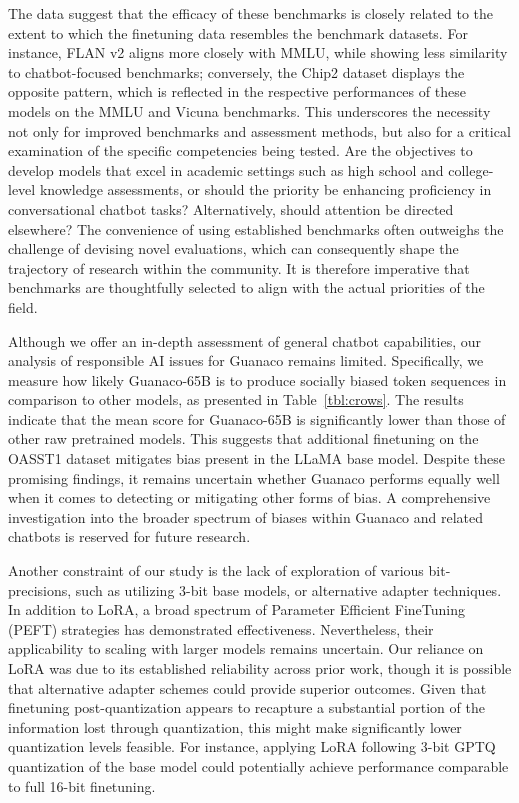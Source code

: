 The data suggest that the efficacy of these benchmarks is closely related to the extent to which the finetuning data resembles the benchmark datasets. For instance, FLAN v2 aligns more closely with MMLU, while showing less similarity to chatbot-focused benchmarks; conversely, the Chip2 dataset displays the opposite pattern, which is reflected in the respective performances of these models on the MMLU and Vicuna benchmarks. This underscores the necessity not only for improved benchmarks and assessment methods, but also for a critical examination of the specific competencies being tested. Are the objectives to develop models that excel in academic settings such as high school and college-level knowledge assessments, or should the priority be enhancing proficiency in conversational chatbot tasks? Alternatively, should attention be directed elsewhere? The convenience of using established benchmarks often outweighs the challenge of devising novel evaluations, which can consequently shape the trajectory of research within the community. It is therefore imperative that benchmarks are thoughtfully selected to align with the actual priorities of the field.

Although we offer an in-depth assessment of general chatbot capabilities, our analysis of responsible AI issues for {Guanaco} remains limited. Specifically, we measure how likely {Guanaco}-65B is to produce socially biased token sequences in comparison to other models, as presented in Table~\ref{tbl:crows}. The results indicate that the mean score for {Guanaco}-65B is significantly lower than those of other raw pretrained models. This suggests that additional finetuning on the OASST1 dataset mitigates bias present in the LLaMA base model. Despite these promising findings, it remains uncertain whether {Guanaco} performs equally well when it comes to detecting or mitigating other forms of bias. A comprehensive investigation into the broader spectrum of biases within {Guanaco} and related chatbots is reserved for future research.

Another constraint of our study is the lack of exploration of various bit-precisions, such as utilizing 3-bit base models, or alternative adapter techniques. In addition to LoRA, a broad spectrum of Parameter Efficient FineTuning (PEFT) strategies has demonstrated effectiveness. Nevertheless, their applicability to scaling with larger models remains uncertain. Our reliance on LoRA was due to its established reliability across prior work, though it is possible that alternative adapter schemes could provide superior outcomes. Given that finetuning post-quantization appears to recapture a substantial portion of the information lost through quantization, this might make significantly lower quantization levels feasible. For instance, applying LoRA following 3-bit GPTQ quantization of the base model could potentially achieve performance comparable to full 16-bit finetuning.

